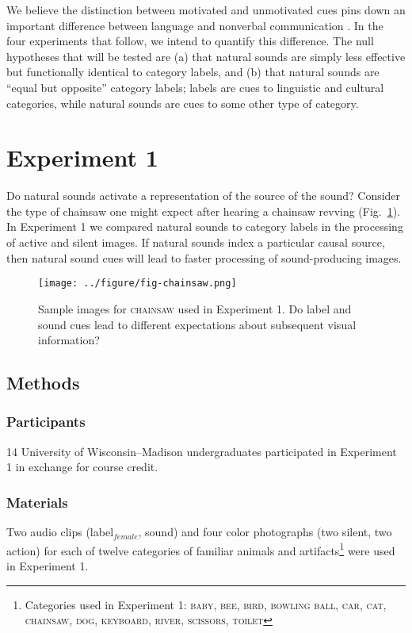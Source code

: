 \documentclass[12pt, titlepage]{article}
\begin{document}
We believe the distinction between motivated and unmotivated cues pins down an important difference between language and nonverbal communication \cite{Burling:1993us}. In the four experiments that follow, we intend to quantify this difference. The null hypotheses that will be tested are (a) that natural sounds are simply less effective but functionally identical to category labels, and (b) that natural sounds are ``equal but opposite'' category labels; labels are cues to linguistic and cultural categories, while natural sounds are cues to some other type of category.

\section{Experiment 1}
Do natural sounds activate a representation of the source of the sound? Consider the type of chainsaw one might expect after hearing a chainsaw revving (Fig.~\ref{fig:chain}). In Experiment 1 we compared natural sounds to category labels in the processing of active and silent images. If natural sounds index a particular causal source, then natural sound cues will lead to faster processing of sound-producing images.

\begin{figure}[h!]
	\centering
	\caption{Sample images for \textsc{chainsaw} used in Experiment 1. Do label and sound cues lead to different expectations about subsequent visual information?}
	\label{fig:chain}
	\texttt{[image: ../figure/fig-chainsaw.png]}
\end{figure}

\subsection{Methods}
\subsubsection*{Participants}
14 University of Wisconsin--Madison undergraduates participated in Experiment 1 in exchange for course credit.

\subsubsection*{Materials}
Two audio clips (label$_{female}$, sound) and four color photographs (two silent, two action) for each of twelve categories of familiar animals and artifacts\footnote{Categories used in Experiment 1: \textsc{baby, bee, bird, bowling ball, car, cat, chainsaw, dog, keyboard, river, scissors, toilet}} were used in Experiment 1.
\end{document}
